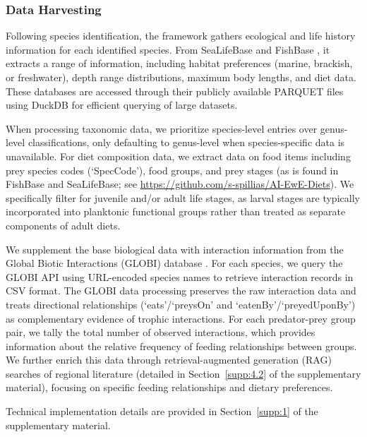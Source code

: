 \subsubsection{Data Harvesting}

Following species identification, the framework gathers ecological and life history information for each identified species. From SeaLifeBase and FishBase \citep{froese2010fishbase}, it extracts a range of information, including habitat preferences (marine, brackish, or freshwater), depth range distributions, maximum body lengths, and diet data. These databases are accessed through their publicly available PARQUET files using DuckDB for efficient querying of large datasets. 

When processing taxonomic data, we prioritize species-level entries over genus-level classifications, only defaulting to genus-level when species-specific data is unavailable. For diet composition data, we extract data on food items including prey species codes (`SpecCode'), food groups, and prey stages (as is found in FishBase and SeaLifeBase; see \url{https://github.com/s-spillias/AI-EwE-Diets}). We specifically filter for juvenile and/or adult life stages, as larval stages are typically incorporated into planktonic functional groups rather than treated as separate components of adult diets.

We supplement the base biological data with interaction information from the Global Biotic Interactions (GLOBI) database \citep{Poelen2014}. For each species, we query the GLOBI API using URL-encoded species names to retrieve interaction records in CSV format. The GLOBI data processing preserves the raw interaction data and treats directional relationships (`eats'/`preysOn' and `eatenBy'/`preyedUponBy') as complementary evidence of trophic interactions. For each predator-prey group pair, we tally the total number of observed interactions, which provides information about the relative frequency of feeding relationships between groups. We further enrich this data through retrieval-augmented generation (RAG) searches of regional literature (detailed in Section~\ref{supp:4.2} of the supplementary material), focusing on specific feeding relationships and dietary preferences.

Technical implementation details are provided in Section~\ref{supp:1} of the supplementary material.
